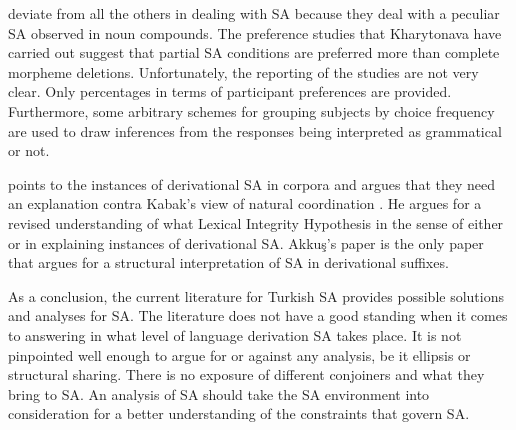\citet{kharytonava2011morphology,kharytonava2012taming,kharytonava2012word} deviate from all the others in dealing with SA because they deal with a peculiar SA observed in noun compounds. The preference studies that Kharytonava have carried out suggest that partial SA conditions are preferred more than complete morpheme deletions. Unfortunately, the reporting of the studies are not very clear. Only percentages in terms of participant preferences are provided. Furthermore, some arbitrary schemes for grouping subjects by choice frequency are used to draw inferences from the responses being interpreted as grammatical or not. 

\citet{akkucs2016suspended} points to the instances of derivational SA in corpora and argues that they need an explanation contra Kabak's view of natural coordination \citep{walchli2005co}. He argues for a revised understanding of what Lexical Integrity Hypothesis in the sense of either \citet{ackema2004beyond} or \citet{lieber2006lexical} in explaining instances of derivational SA. Akkuş's paper is the only paper that argues for a structural interpretation of SA in derivational suffixes. 

As a conclusion, the current literature for Turkish SA provides possible solutions and analyses for SA. The literature does not have a good standing when it comes to answering in what level of language derivation SA takes place. It is not pinpointed well enough to argue for or against any analysis, be it ellipsis or structural sharing. There is no exposure of different conjoiners and what they bring to SA. An analysis of SA should take the SA environment into consideration for a better understanding of the constraints that govern SA.
